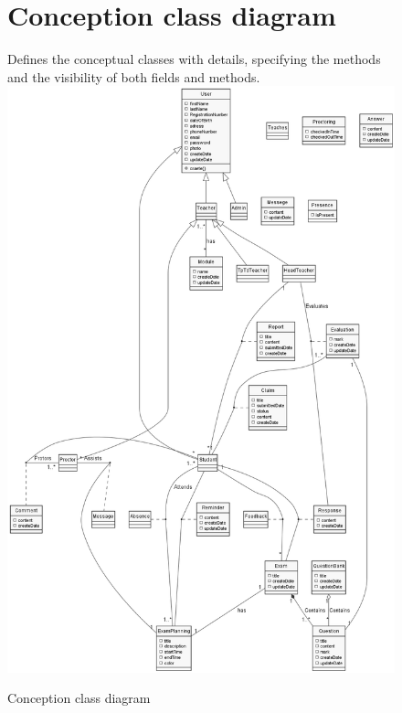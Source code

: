 \documentclass[]{uc2pfecaneva}
\begin{document}
    \begin{figure}
        \section{Conception class diagram}
        \raggedright Defines the conceptual classes with details, specifying the methods and the visibility of both fields and methods.
        \linebreak
        \includegraphics[width=\textwidth]{images/CCD}
        \caption{Conception class diagram}
    \end{figure}
    \clearpage
\end{document}
